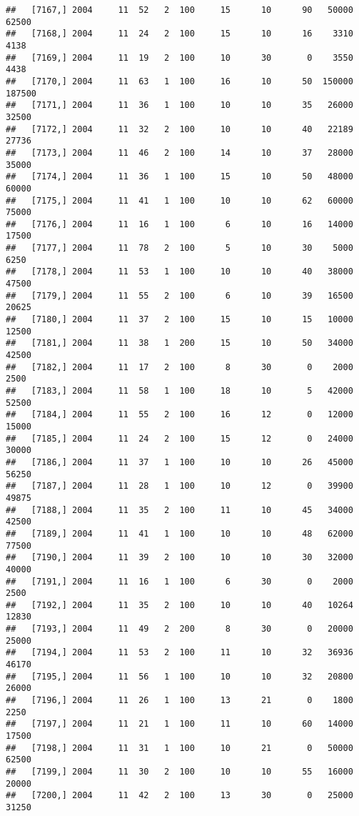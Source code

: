 \documentclass{article}\usepackage[]{graphicx}\usepackage[]{color}
\makeatletter
\newenvironment{kframe}{%
 \def\at@end@of@kframe{}%
 \ifinner\ifhmode%
  \def\at@end@of@kframe{\end{minipage}}%
  \begin{minipage}{\columnwidth}%
 \fi\fi%
 \def\FrameCommand##1{\hskip\@totalleftmargin \hskip-\fboxsep
 \colorbox{shadecolor}{##1}\hskip-\fboxsep
     \hskip-\linewidth \hskip-\@totalleftmargin \hskip\columnwidth}%
 \MakeFramed {\advance\hsize-\width
   \@totalleftmargin\z@ \linewidth\hsize
   \@setminipage}}%
 {\par\unskip\endMakeFramed%
 \at@end@of@kframe}
\newenvironment{knitrout}{}{} %
\makeatother
\begin{document}
\begin{knitrout}
\begin{kframe}
\begin{verbatim}
##   [7167,] 2004     11  52   2  100     15      10      90   50000   62500
##   [7168,] 2004     11  24   2  100     15      10      16    3310    4138
##   [7169,] 2004     11  19   2  100     10      30       0    3550    4438
##   [7170,] 2004     11  63   1  100     16      10      50  150000  187500
##   [7171,] 2004     11  36   1  100     10      10      35   26000   32500
##   [7172,] 2004     11  32   2  100     10      10      40   22189   27736
##   [7173,] 2004     11  46   2  100     14      10      37   28000   35000
##   [7174,] 2004     11  36   1  100     15      10      50   48000   60000
##   [7175,] 2004     11  41   1  100     10      10      62   60000   75000
##   [7176,] 2004     11  16   1  100      6      10      16   14000   17500
##   [7177,] 2004     11  78   2  100      5      10      30    5000    6250
##   [7178,] 2004     11  53   1  100     10      10      40   38000   47500
##   [7179,] 2004     11  55   2  100      6      10      39   16500   20625
##   [7180,] 2004     11  37   2  100     15      10      15   10000   12500
##   [7181,] 2004     11  38   1  200     15      10      50   34000   42500
##   [7182,] 2004     11  17   2  100      8      30       0    2000    2500
##   [7183,] 2004     11  58   1  100     18      10       5   42000   52500
##   [7184,] 2004     11  55   2  100     16      12       0   12000   15000
##   [7185,] 2004     11  24   2  100     15      12       0   24000   30000
##   [7186,] 2004     11  37   1  100     10      10      26   45000   56250
##   [7187,] 2004     11  28   1  100     10      12       0   39900   49875
##   [7188,] 2004     11  35   2  100     11      10      45   34000   42500
##   [7189,] 2004     11  41   1  100     10      10      48   62000   77500
##   [7190,] 2004     11  39   2  100     10      10      30   32000   40000
##   [7191,] 2004     11  16   1  100      6      30       0    2000    2500
##   [7192,] 2004     11  35   2  100     10      10      40   10264   12830
##   [7193,] 2004     11  49   2  200      8      30       0   20000   25000
##   [7194,] 2004     11  53   2  100     11      10      32   36936   46170
##   [7195,] 2004     11  56   1  100     10      10      32   20800   26000
##   [7196,] 2004     11  26   1  100     13      21       0    1800    2250
##   [7197,] 2004     11  21   1  100     11      10      60   14000   17500
##   [7198,] 2004     11  31   1  100     10      21       0   50000   62500
##   [7199,] 2004     11  30   2  100     10      10      55   16000   20000
##   [7200,] 2004     11  42   2  100     13      30       0   25000   31250

\end{verbatim}
\end{kframe}
\end{knitrout}
\end{document}

